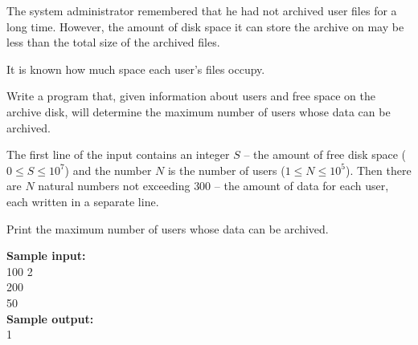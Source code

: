 \documentclass[a4paper]{article}
\begin{document}
The system administrator remembered that he had not archived user files for a long time. However, the amount of disk space it can store the archive on may be less than the total size of the archived files.

It is known how much space each user's files occupy.

Write a program that, given information about users and free space on the archive disk, will determine the maximum number of users whose data can be archived.

The first line of the input contains an integer $S$ -- the amount of free disk space ($0 \le S \le 10^7$) and the number $N$ is the number of users ($1 \le N \le 10^5$). Then there are $N$ natural numbers not exceeding $300$ -- the amount of data for each user, each written in a separate line.

Print the maximum number of users whose data can be archived.

\LINE

\noindent \textbf{Sample input:}\\
100 2\\
200\\
50\\


\noindent \textbf{Sample output:}\\
1
\end{document}
